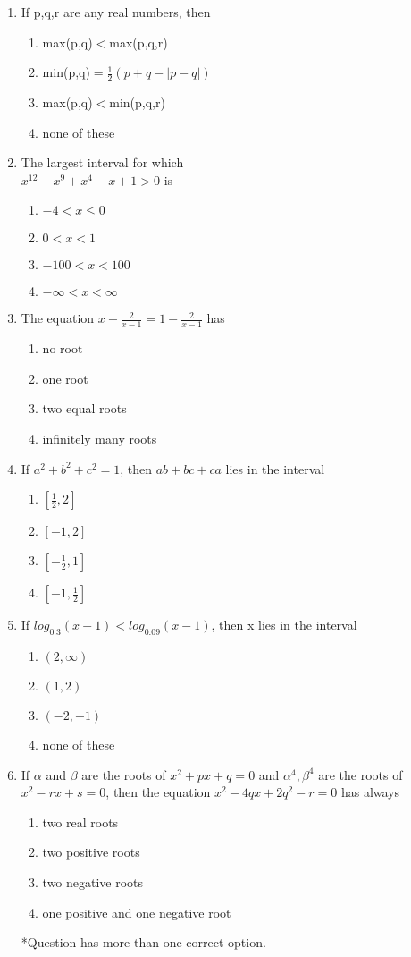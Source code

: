 \documentclass[journal,12pt,twocolumn]{IEEEtran}
\begin{document}
\begin{enumerate}[label=\arabic*]
\item If p,q,r are any real numbers, then
\begin{enumerate}
\item max(p,q)$<$max(p,q,r)
\item min(p,q)$=\frac{1}{2}(p+q-|p-q|)$ 
\item max(p,q)$<$min(p,q,r)
\item none of these 
\end{enumerate}

\item The largest interval for which\\ $x^{12}-x^{9}+x^{4}-x+1>0$ is 
\begin{enumerate}
\item $-4<x\leq0$
\item $0<x<1$ 
\item $-100<x<100$
\item $-\infty<x<\infty$ 
\end{enumerate}

\item The equation $x-\frac{2}{x-1}=1-\frac{2}{x-1}$ has
\begin{enumerate}
\item no root
\item one root 
\item two equal roots
\item infinitely many roots
\end{enumerate}

\item If $a^{2}+b^{2}+c^{2}=1$, then $ab+bc+ca$ lies in the interval
\begin{enumerate}
\item $[\frac{1}{2},2]$
\item $[-1,2]$ 
\item $[-\frac{1}{2},1]$
\item $[-1,\frac{1}{2}]$
\end{enumerate}

\item If $log_{0.3}(x-1)<log_{0.09}(x-1)$, then x lies in the interval
\begin{enumerate}
\item $(2,\infty)$
\item $(1,2)$ 
\item $(-2,-1)$
\item none of these 
\end{enumerate}

\item If $\alpha$ and $\beta$ are the roots of $x^{2}+px+q=0 $ and $ \alpha^{4},\beta^{4}$ are the roots of $x^{2}-rx+s=0$, then the equation $x^{2}-4qx+2q^{2}-r=0$ has always
\begin{enumerate}
\item two real roots
\item two positive roots
\item two negative roots
\item one positive and one negative root 
\end{enumerate}
*Question has more than one correct option.


\end{enumerate}
\end{document}
